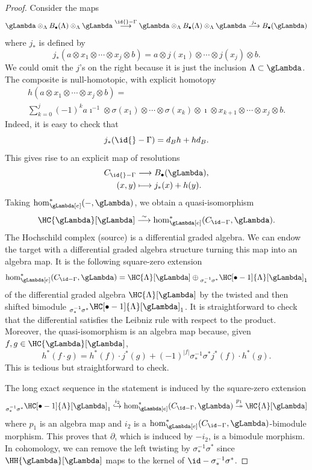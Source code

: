 \documentclass[a4paper]{amsart}
\begin{document}
\begin{proof}
  Consider the maps
  \[\gLambda\otimes_{\Lambda}B_{\bullet}(\Lambda)\otimes_{\Lambda}\gLambda
      \stackrel{\id{}-\Gamma}{\longrightarrow}
      \gLambda\otimes_{\Lambda}B_{\bullet}(\Lambda)\otimes_{\Lambda}\gLambda
      \stackrel{j_*}{\longrightarrow}
      B_{\bullet}(\gLambda)
  \]
  where \(j_*\) is defined by
  \[j_*(a\otimes  x_1\otimes\cdots\otimes  x_j\otimes b)=a\otimes  j(x_1)\otimes\cdots\otimes  j(x_j)\otimes b.\]
  We could omit the \(j\)'s on the right because it is just the inclusion \(\Lambda\subset\gLambda\).
  The composite is null-homotopic, with explicit homotopy
  \begin{multline*}
      h(a\otimes  x_1\otimes\cdots\otimes  x_j\otimes b)=\\
      \sum_{k=0}^j(-1)^k
      a\imath^{-1}\otimes  \sigma(x_1)\otimes\cdots\otimes\sigma(x_k)\otimes\imath\otimes x_{k+1}\otimes\cdots\otimes  x_j\otimes b.
  \end{multline*}
  Indeed, it is easy to check that
  \[j_*(\id{}-\Gamma)=d_Bh+hd_B.\]
  This gives rise to an explicit map of resolutions
  \begin{align*}
      C_{\id{}-\Gamma} & \longrightarrow B_\bullet(\gLambda), \\
      (x,y)            & \longmapsto j_*(x)+h(y).
  \end{align*}
  Taking \(\hom^*_{\gLambda[e]}(-,\gLambda)\), we obtain a quasi-isomorphism
  \[\HC{\gLambda}[\gLambda]\stackrel{\sim}{\longrightarrow}\hom^*_{\gLambda[e]}(C_{\id-\Gamma},\gLambda).\]
  The Hochschild complex (source) is a differential graded algebra. We can endow the target with a differential graded algebra structure turning this map into an algebra map. It is the following square-zero extension
  \[\hom^*_{\gLambda[e]}(C_{\id -\Gamma},\gLambda)=
      \HC{\Lambda}[\gLambda]\oplus {}_{\sigma^{-1}_*\sigma^*}\HC[\bullet-1]{\Lambda}[\gLambda]_1\]
  of the differential graded algebra \(\HC{\Lambda}[\gLambda]\) by the twisted and then shifted bimodule \({}_{\sigma^{-1}_*\sigma^*}\HC[\bullet-1]{\Lambda}[\gLambda]_1\).
  It is straightforward to check that the differential satisfies the Leibniz rule with respect to the product. Moreover, the quasi-isomorphism is an algebra map because, given \(f,g\in \HC{\gLambda}[\gLambda]\),
  \[h^*(f\cdot g)=h^*(f)\cdot j^*(g)+(-1)^{|f|}\sigma^{-1}_*\sigma^*j^*(f)\cdot h^*(g).\]
  This is tedious but straightforward to check.

  The long exact sequence in the statement is induced by the square-zero extension
  \[{}_{\sigma^{-1}_*\sigma^*}\HC[\bullet-1]{\Lambda}[\gLambda]_1
      \stackrel{i_2}{\hookrightarrow}
      \hom^*_{\gLambda[e]}(C_{\id -\Gamma},\gLambda)
      \stackrel{p_1}{\twoheadrightarrow}
      \HC{\Lambda}[\gLambda]\]
  where \(p_1\) is an algebra map and \(i_2\) is a \(\hom^*_{\gLambda[e]}(C_{\id -\Gamma},\gLambda)\)-bimodule morphism.
  This proves that \(\partial\), which is induced by \(-i_2\), is a bimodule morphism. In cohomology, we can remove the left twisting by \(\sigma^{-1}_*\sigma^*\) since \(\HH{\gLambda}[\gLambda]\) maps to the kernel of \(\id -\sigma^{-1}_*\sigma^*\).


\end{proof}
\end{document}
